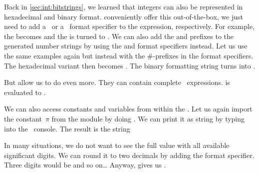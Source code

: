%
\begin{sloppypar}%
Back in \cref{sec:int:bitstrings}, we learned that integers can also be represented in hexadecimal and binary format.
 conveniently offer this out-of-the-box, we just need to add a~ or a~ format specifier to the expression, respectively.
For example, the   becomes  and the   is turned to .
We can also add the  and  prefixes to the generated number strings by using the  and  format specifiers instead.
Let us use the same examples again but instead with the \#-prefixes in the format specifiers.
The hexadecimal variant  then becomes .
The binary formatting string  turns into .%
\end{sloppypar}%
%
\begin{sloppypar}%
But  allow us to do even more.
They can contain complete \python\ expressions.
 is evaluated to .%
\end{sloppypar}%
%
\begin{sloppypar}%
We can also access constants and variables from within the .
Let us again import the constant~$\pi$ from the  module by doing .
We can print it as string by typing  into the \python\ console.
The result is the string %
\end{sloppypar}%
%
\begin{sloppypar}%
In many situations, we do not want to see the full  value with all available significant digits.
We can round it to two decimals by adding the  format specifier.
Three digits would be  and so on{\dots}
Anyway,  gives us .%
\end{sloppypar}%
